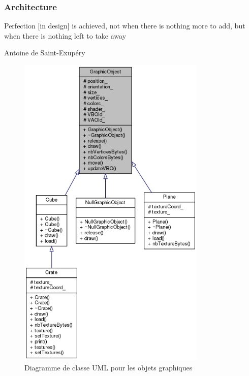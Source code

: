 \documentclass[a4paper,french,12pt]{article}
\begin{document}
	\subsubsection{Architecture}
	\epigraph{Perfection [in design] is achieved, not when there is nothing more to add, but when there is nothing left to take away}{Antoine de Saint-Exupéry}
	    \FloatBarrier
	    \begin{figure}
				  \centering
				  \includegraphics[width=0.8\textwidth]{uml1.png}
				  \caption{Diagramme de classe UML pour les objets graphiques}
	    \end{figure}
	    
\end{document}

